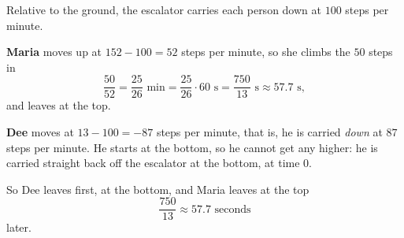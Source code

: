 Relative to the ground, the escalator carries each person down at $100$ steps per minute.

\textbf{Maria} moves up at $152-100=52$ steps per minute, so she climbs the $50$ steps in
\[\dfrac{50}{52}=\dfrac{25}{26}\text{ min}=\dfrac{25}{26}\cdot60\text{ s}=\dfrac{750}{13}\text{ s}\approx57.7\text{ s},\]
and leaves at the top.

\textbf{Dee} moves at $13-100=-87$ steps per minute, that is, he is carried \emph{down} at $87$ steps per minute. He starts at the bottom, so he cannot get any higher: he is carried straight back off the escalator at the bottom, at time $0$.

So Dee leaves first, at the bottom, and Maria leaves at the top
\[\boxed{\dfrac{750}{13}\approx57.7\text{ seconds}}\]
later.
